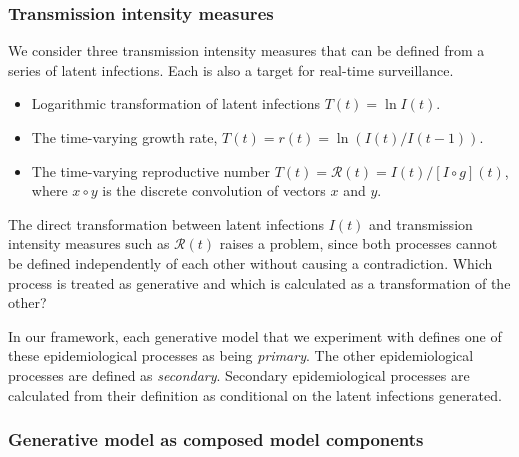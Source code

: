 \documentclass{getwriting}
\begin{document}
\subsubsection{Transmission intensity measures}

We consider three transmission intensity measures that can be defined from a series of latent infections. Each is also a target for real-time surveillance.

\begin{itemize}
    \item Logarithmic transformation of latent infections $T(t) = \ln I(t)$.
    \item The time-varying growth rate, $T(t) = r(t) = \ln (I(t) / I(t-1))$.
    \item The time-varying reproductive number $T(t) = \mathcal{R}(t) = I(t) / [I \circ g](t)$, where $x\circ y$ is the discrete convolution of vectors $x$ and $y$.
\end{itemize}

The direct transformation between latent infections $I(t)$ and transmission intensity measures such as $\mathcal{R}(t)$ raises a problem, since both processes cannot be defined independently of each other without causing a contradiction. Which process is treated as generative and which is calculated as a transformation of the other?

In our framework, each generative model that we experiment with defines one of these epidemiological processes as being \textit{primary}. The other epidemiological processes are defined as \textit{secondary}. Secondary epidemiological processes are calculated from their definition as conditional on the latent infections generated.

\subsubsection{Generative model as composed model components}
\end{document}
